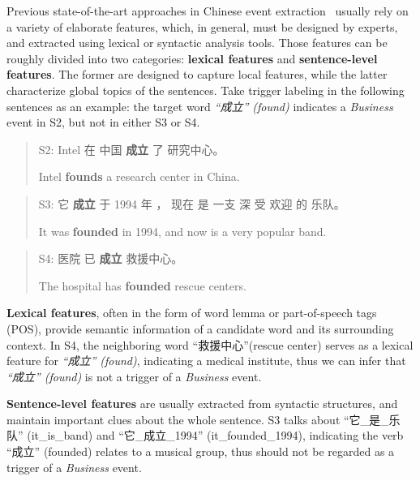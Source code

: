 Previous state-of-the-art approaches in Chinese event extraction~\cite{chen2009language,li2012employing,chen2012joint,li2013joint} usually rely on a variety of elaborate features, which, in general, must be designed by experts, and extracted using lexical or syntactic analysis tools. Those features can be roughly divided into two categories: \textbf{lexical features} and \textbf{sentence-level features}. The former are designed to capture local features, while the latter characterize global topics of the sentences.  Take trigger labeling in the following sentences as an example: the target word \textit{``成立'' (found)} indicates a \emph{Business} event in S2, but not in either S3 or S4.

\begin{quote}
S2: Intel 在 中国 \textbf{成立} 了 研究中心。

\hspace{0.52cm} Intel \textbf{founds} a research center in China.
\end{quote}

\begin{quote}
S3: 它 \textbf{成立} 于 1994 年 ， 现在 是 一支 深 受 欢迎 的 乐队。

\hspace{0.52cm} It was \textbf{founded} in 1994, and now is a very popular band.
\end{quote}

\begin{quote}
S4: 医院 已 \textbf{成立} 救援中心。

\hspace{0.52cm} The hospital has \textbf{founded} rescue centers.
\end{quote}

\textbf{Lexical features}, often in the form of word lemma or part-of-speech tags (POS), provide semantic information of a candidate word and its surrounding context. In S4, the neighboring word ``救援中心''(rescue center) serves as a lexical feature for \textit{``成立'' (found)}, indicating a medical institute,  thus we can infer that \textit{``成立'' (found)} is not a trigger of a \emph{Business} event.

\textbf{Sentence-level features} are usually extracted from syntactic structures, and  maintain important clues about the whole sentence. S3 talks about ``它\_是\_乐队'' (it\_is\_band) and ``它\_成立\_1994'' (it\_founded\_1994), indicating the verb ``成立'' (founded) relates to a musical group, thus should not be regarded as a trigger of a \emph{Business} event.

